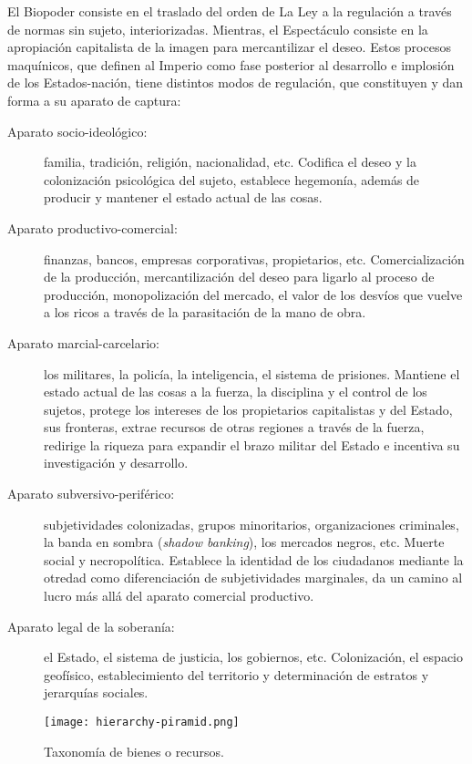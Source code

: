 El Biopoder consiste en el traslado del orden de La Ley a la regulación a través de normas sin sujeto, interiorizadas. Mientras, el Espectáculo consiste en la apropiación capitalista de la imagen para mercantilizar el deseo. Estos procesos maquínicos, que definen al Imperio como fase posterior al desarrollo e implosión de los Estados-nación, tiene distintos modos de regulación, que constituyen y dan forma a su aparato de captura:

\begin{description}
	\item[Aparato socio-ideológico:] familia, tradición, religión, nacionalidad, etc. Codifica el deseo y la colonización psicológica del sujeto, establece hegemonía, además de producir y mantener el estado actual de las cosas.

	\item[Aparato productivo-comercial:] finanzas, bancos, empresas corporativas, propietarios, etc. Comercialización de la producción, mercantilización del deseo para ligarlo al proceso de producción, monopolización del mercado, el valor de los desvíos que vuelve a los ricos a través de la parasitación de la mano de obra.

	\item[Aparato marcial-carcelario:] los militares, la policía, la inteligencia, el sistema de prisiones. Mantiene el estado actual de las cosas a la fuerza, la disciplina y el control de los sujetos, protege los intereses de los propietarios capitalistas y del Estado, sus fronteras, extrae recursos de otras regiones a través de la fuerza, redirige la riqueza para expandir el brazo militar del Estado e incentiva su investigación y desarrollo.

	\item[Aparato subversivo-periférico:] subjetividades colonizadas, grupos minoritarios, organizaciones criminales, la banda en sombra (\emph{shadow banking}), los mercados negros, etc. Muerte social y necropolítica. Establece la identidad de los ciudadanos mediante la otredad como diferenciación de subjetividades marginales, da un camino al lucro más allá del aparato comercial productivo.

	\item[Aparato legal de la soberanía:] el Estado, el sistema de justicia, los gobiernos, etc. Colonización, el espacio geofísico, establecimiento del territorio y determinación de estratos y jerarquías sociales.
\end{description}

\begin{figure}[htbp]
	\centering
	\texttt{[image: hierarchy-piramid.png]}
	\caption{Taxonomía de bienes o recursos.}
	\label{fig:piramide}
\end{figure}

